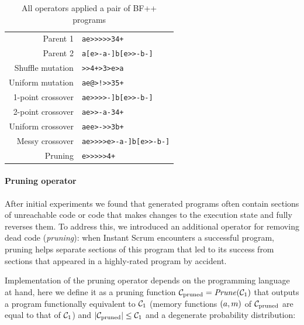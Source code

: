 \begin{table}
    \centering
    \begin{tabular}{r|l}
         Parent 1 & \color{blue}\verb|ae>>>>>34+| \\
         Parent 2 & \color{red}\verb|a[e>-a-]b[e>>-b-]| \\
         \midrule
         Shuffle mutation & \color{blue}\verb|>>4+>3>e>a| \\
         Uniform mutation & \color{blue}\verb|ae|\color{black}\verb|@|\color{blue}\verb|>|\color{black}\verb|!|\color{blue}\verb|>>3|\color{black}\verb|5|\color{blue}\verb|+| \\
         1-point crossover & \color{blue}\verb|ae>>>>|\color{red}\verb|-]b[e>>-b-]| \\
         2-point crossover & \color{blue}\verb|ae>|\color{red}\verb|>-a-|\color{blue}\verb|34+| \\
         Uniform crossover & \color{blue}\verb|ae|\color{red}\verb|e|\color{blue}\verb|>|\color{red}\verb|-|\color{blue}\verb|>>3|\color{red}\verb|b|\color{blue}\verb|+| \\
         Messy crossover & \color{blue}\verb|ae>>>>|\color{red}\verb|e>-a-]b[e>>-b-]| \\
         Pruning & \color{blue}\verb|e>>>>>4+| \\
    \end{tabular}
    \caption{All operators applied a pair of BF++ programs}
\end{table}


\paragraph{Pruning operator}

After initial experiments  we found that generated programs often contain sections of unreachable code or code that makes changes to the execution state and fully reverses them.
To address this, we introduced an additional operator for removing dead code (\emph{pruning}): when Instant Scrum encounters a successful program, pruning helps separate sections of this program that led to its success from sections that appeared in a highly-rated program by accident.  

Implementation of the pruning operator depends on the programming language at hand, here we define it as a pruning function $\mathcal{C}_\text{pruned}=\mathit{Prune}(\mathcal{C}_1)$ that outputs a program functionally equivalent to $\mathcal{C}_1$ (memory functions $(a,m)$ of $\mathcal{C}_\text{pruned}$ are equal to that of $\mathcal{C}_1$) and $|\mathcal{C}_\text{pruned}| \leq \mathcal{C}_1$ and a degenerate probability distribution:

